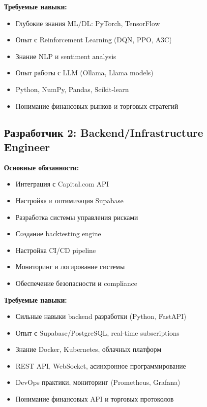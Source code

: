 \documentclass[12pt,a4paper]{article}
\begin{document}
\textbf{Требуемые навыки:}
\begin{itemize}
    \item Глубокие знания ML/DL: PyTorch, TensorFlow
    \item Опыт с Reinforcement Learning (DQN, PPO, A3C)
    \item Знание NLP и sentiment analysis
    \item Опыт работы с LLM (Ollama, Llama models)
    \item Python, NumPy, Pandas, Scikit-learn
    \item Понимание финансовых рынков и торговых стратегий
\end{itemize}

\subsection{Разработчик 2: Backend/Infrastructure Engineer}
\textbf{Основные обязанности:}
\begin{itemize}
    \item Интеграция с Capital.com API
    \item Настройка и оптимизация Supabase
    \item Разработка системы управления рисками
    \item Создание backtesting engine
    \item Настройка CI/CD pipeline
    \item Мониторинг и логирование системы
    \item Обеспечение безопасности и compliance
\end{itemize}

\textbf{Требуемые навыки:}
\begin{itemize}
    \item Сильные навыки backend разработки (Python, FastAPI)
    \item Опыт с Supabase/PostgreSQL, real-time subscriptions
    \item Знание Docker, Kubernetes, облачных платформ
    \item REST API, WebSocket, асинхронное программирование
    \item DevOps практики, мониторинг (Prometheus, Grafana)
    \item Понимание финансовых API и торговых протоколов
\end{itemize}
\end{document}
